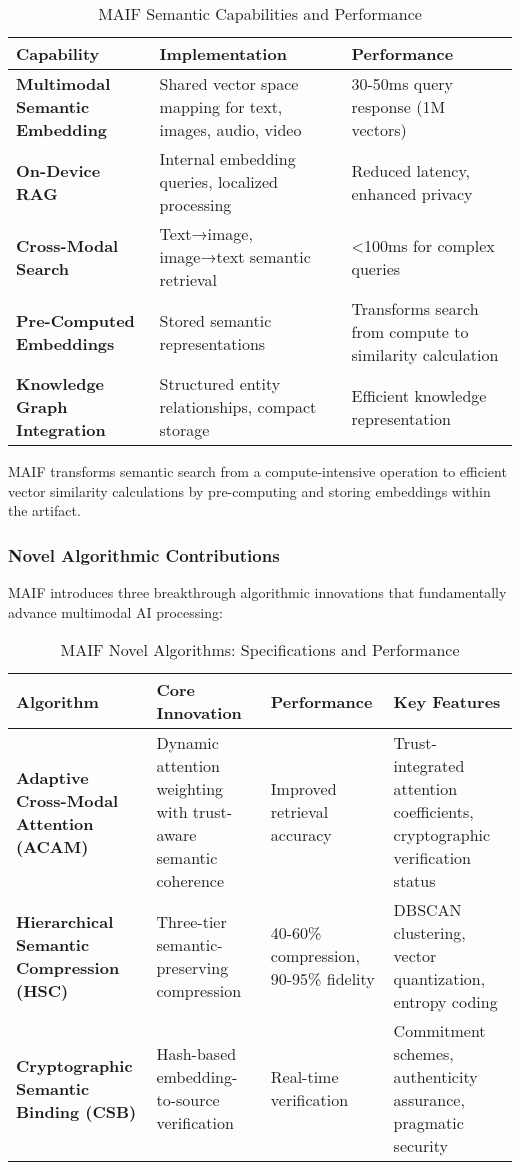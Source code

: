 \documentclass[conference]{IEEEtran}
\begin{document}
\begin{table*}[!t]
\renewcommand{\arraystretch}{1.3}
\caption{MAIF Semantic Capabilities and Performance}
\label{tab:semantic-capabilities}
\centering
\footnotesize
\begin{tabular}{p{3.5cm}p{5cm}p{4.5cm}}
\toprule
\textbf{Capability} & \textbf{Implementation} & \textbf{Performance} \\
\midrule
\textbf{Multimodal Semantic Embedding} & Shared vector space mapping for text, images, audio, video & 30-50ms query response (1M vectors) \\
\textbf{On-Device RAG} & Internal embedding queries, localized processing & Reduced latency, enhanced privacy \\
\textbf{Cross-Modal Search} & Text→image, image→text semantic retrieval & <100ms for complex queries \\
\textbf{Pre-Computed Embeddings} & Stored semantic representations & Transforms search from compute to similarity calculation \\
\textbf{Knowledge Graph Integration} & Structured entity relationships, compact storage & Efficient knowledge representation \\
\bottomrule
\end{tabular}
\end{table*}

MAIF transforms semantic search from a compute-intensive operation to efficient vector similarity calculations by pre-computing and storing embeddings within the artifact.


\subsubsection{Novel Algorithmic Contributions}

MAIF introduces three breakthrough algorithmic innovations that fundamentally advance multimodal AI processing:

\begin{table*}[!t]
\renewcommand{\arraystretch}{1.3}
\caption{MAIF Novel Algorithms: Specifications and Performance}
\label{tab:novel-algorithms}
\centering
\footnotesize
\begin{tabular}{p{3.5cm}p{5cm}p{3cm}p{3.5cm}}
\toprule
\textbf{Algorithm} & \textbf{Core Innovation} & \textbf{Performance} & \textbf{Key Features} \\
\midrule
\textbf{Adaptive Cross-Modal Attention (ACAM)} & Dynamic attention weighting with trust-aware semantic coherence & Improved retrieval accuracy & Trust-integrated attention coefficients, cryptographic verification status \\
\textbf{Hierarchical Semantic Compression (HSC)} & Three-tier semantic-preserving compression & 40-60\% compression, 90-95\% fidelity & DBSCAN clustering, vector quantization, entropy coding \\
\textbf{Cryptographic Semantic Binding (CSB)} & Hash-based embedding-to-source verification & Real-time verification & Commitment schemes, authenticity assurance, pragmatic security \\
\bottomrule
\end{tabular}
\end{table*}
\end{document}
